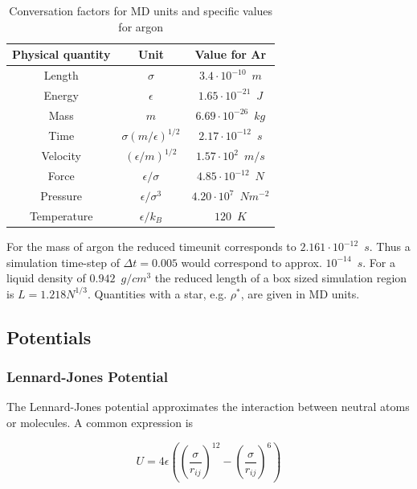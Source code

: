 \documentclass[a4paper]{article}
\begin{document}
\begin{table}[h]
\begin{center}
\begin{tabular}{|c|c|c|}
\hline 
Physical quantity & Unit & Value for Ar \\ 
\hline 
Length & $\sigma$ & $3.4 \cdot 10^{-10} \enspace m$  \\ 
\hline 
Energy & $\epsilon$ & $1.65 \cdot 10^{-21} \enspace J$	 \\ 
\hline 
Mass & $m$ & $6.69 \cdot 10^{-26} \enspace kg$ \\ 
\hline 
Time & $\sigma(m/ \epsilon)^{1/2}$ & $2.17 \cdot 10^{-12} \enspace s$ \\ 
\hline 
Velocity & $(\epsilon/m)^{1/2}$ & $1.57 \cdot 10^2 \enspace m/s$ \\ 
\hline 
Force & $\epsilon/\sigma$ & $4.85 \cdot 10^{-12} \enspace N$ \\ 
\hline 
Pressure & $\epsilon/\sigma^3$ & $4.20 \cdot 10^7 \enspace Nm^{-2}$ \\ 
\hline 
Temperature & $\epsilon/k_B$ & $120 \enspace K$ \\ 
\hline 
\end{tabular} 
\caption{Conversation factors for MD units  and specific values for argon}
\label{tab:conversation_factors}
\end{center}
\end{table}

For the mass of argon the reduced timeunit corresponds to $2.161 \cdot 10^{-12} \enspace s$. Thus a simulation time-step of $\Delta t = 0.005$ would correspond to approx. $10^{-14} \enspace s$. For a liquid density of $0.942 \enspace g/cm^3$ the reduced length of a box sized simulation region is $L = 1.218 N^{1/3}$. Quantities with a star, e.g. $\rho^*$, are given in MD units.

\subsection{Potentials}
\label{subsec:potentials}

\subsubsection{Lennard-Jones Potential}
\label{subsubsec:lennard-jones-potential}

The Lennard-Jones potential approximates the interaction between neutral atoms or molecules. A common expression is

\begin{equation}
U = 4 \epsilon \left( \left( \frac{\sigma}{r_{ij}} \right)^{12} - \left( \frac{\sigma}{r_{ij}} \right)^6 \right)
\label{eq:lennard_jones}
\end{equation}
\end{document}
